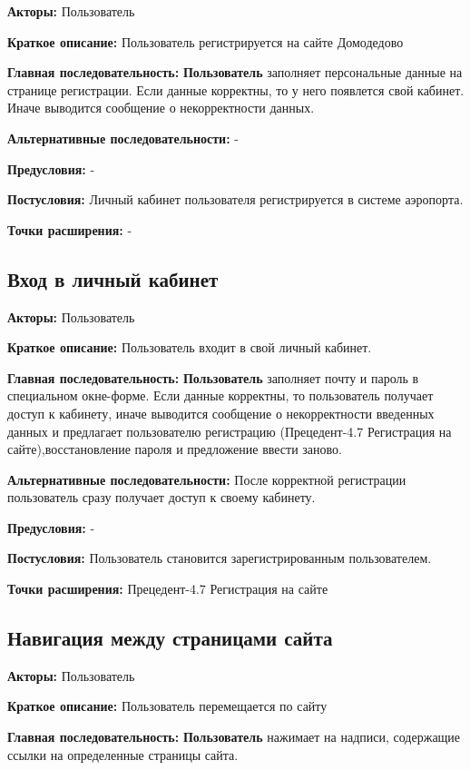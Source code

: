\textbf{Акторы:} Пользователь

\textbf{Краткое описание:} Пользователь регистрируется на сайте Домодедово

\textbf{Главная последовательность:} \textbf{Пользователь} заполняет персональные данные на странице регистрации.
Если данные корректны, то у него появлется свой кабинет. Иначе выводится сообщение о некорректности данных.

\textbf{Альтернативные последовательности:} -

\textbf{Предусловия:} -

\textbf{Постусловия:} Личный кабинет пользователя регистрируется в системе аэропорта.

\textbf{Точки расширения:} -




\subsection{Вход в личный кабинет}

\textbf{Акторы:} Пользователь

\textbf{Краткое описание:} Пользователь входит в свой личный кабинет.

\textbf{Главная последовательность:} \textbf{Пользователь} заполняет почту и пароль в специальном окне-форме. Если данные корректны, то 
пользователь получает доступ к кабинету, иначе выводится сообщение о некорректности введенных данных и предлагает пользователю регистрацию
(Прецедент-4.7 Регистрация на сайте),восстановление пароля и предложение ввести заново.

\textbf{Альтернативные последовательности:} После корректной регистрации пользователь сразу получает доступ к своему кабинету.

\textbf{Предусловия:} -

\textbf{Постусловия:} Пользователь становится зарегистрированным пользователем.

\textbf{Точки расширения:} Прецедент-4.7 Регистрация на сайте




\subsection{Навигация между страницами сайта}

\textbf{Акторы:} Пользователь

\textbf{Краткое описание:} Пользователь перемещается по сайту

\textbf{Главная последовательность:} \textbf{Пользователь} нажимает на надписи, содержащие ссылки на определенные страницы сайта.

